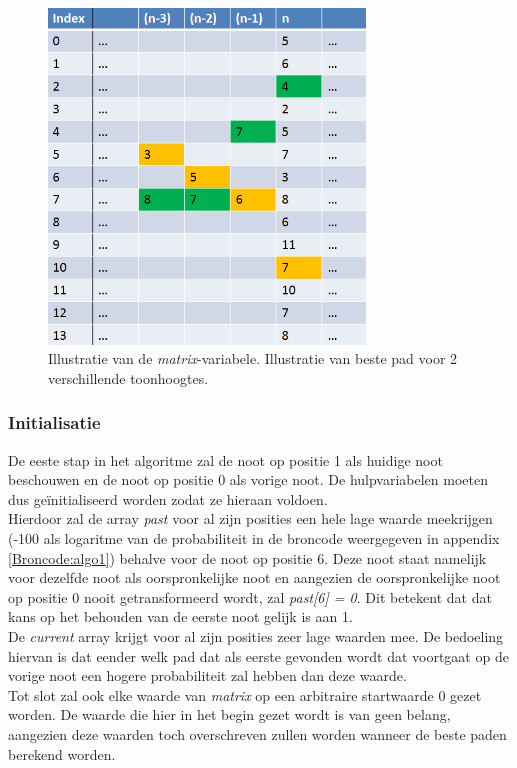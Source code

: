 \begin{figure}[!ht]
  \centering
  \includegraphics[width=0.75\textwidth]{4_Efficient_Toepassen_Transformatie/matrix}
  \caption{Illustratie van de \textit{matrix}-variabele. Illustratie van beste pad voor 2 verschillende toonhoogtes.}
  \label{figuur:matrix}
\end{figure}

\subsubsection{Initialisatie}
De eeste stap in het algoritme zal de noot op positie 1 als huidige noot beschouwen en de noot op positie 0 als vorige noot. De hulpvariabelen moeten dus ge\"initialiseerd worden zodat ze hieraan voldoen.\\ 
Hierdoor zal de array \textit{past} voor al zijn posities een hele lage waarde meekrijgen (-100 als logaritme van de probabiliteit in de broncode weergegeven in appendix \ref{Broncode:algo1}) behalve voor de noot op positie 6. Deze noot staat namelijk voor dezelfde noot als oorspronkelijke noot en aangezien de oorspronkelijke noot op positie 0 nooit getransformeerd wordt, zal \textit{past[6] = 0}. Dit betekent dat dat kans op het behouden van de eerste noot gelijk is aan 1.\\ 
De \textit{current} array krijgt voor al zijn posities zeer lage waarden mee. De bedoeling hiervan is dat eender welk pad dat als eerste gevonden wordt dat voortgaat op de vorige noot een hogere probabiliteit zal hebben dan deze waarde.\\ Tot slot zal ook elke waarde van \textit{matrix} op een arbitraire startwaarde 0 gezet worden. De waarde die hier in het begin gezet wordt is van geen belang, aangezien deze waarden toch overschreven zullen worden wanneer de beste paden berekend worden.

